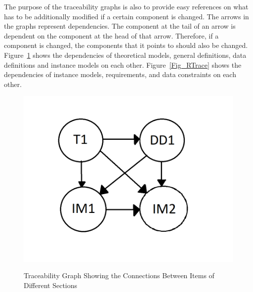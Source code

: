 \documentclass[12pt]{article}
\begin{document}
The purpose of the traceability graphs is also to provide easy references on
what has to be additionally modified if a certain component is changed.  The
arrows in the graphs represent dependencies. The component at the tail of an
arrow is dependent on the component at the head of that arrow. Therefore, if a
component is changed, the components that it points to should also be
changed. Figure~\ref{Fig_ATrace} shows the dependencies of theoretical models,
general definitions, data definitions and instance models on each other. 
Figure~\ref{Fig_RTrace} shows the dependencies of
instance models, requirements, and data constraints on each other.

\begin{figure}[h!]
	\begin{center}
		
		{
			\includegraphics[width=\textwidth]{ATrace.png}
		}
		\caption{\label{Fig_ATrace} Traceability Graph Showing the Connections 
		Between Items of Different Sections}
 	\end{center}
 \end{figure}
\end{document}

